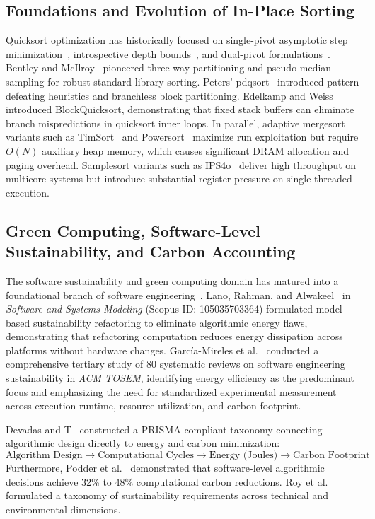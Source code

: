 \documentclass[journal]{IEEEtran}
\begin{document}
\subsection{Foundations and Evolution of In-Place Sorting}
Quicksort optimization has historically focused on single-pivot asymptotic step minimization~\cite{hoare1962quicksort,knuth1998art,sedgewick1977analysis}, introspective depth bounds~\cite{musser1997introspective}, and dual-pivot formulations~\cite{yaroslavskiy2009dual,wild2012average}. Bentley and McIlroy~\cite{bentley1993engineering} pioneered three-way partitioning and pseudo-median sampling for robust standard library sorting. Peters' pdqsort~\cite{peters2015pdqsort} introduced pattern-defeating heuristics and branchless block partitioning. Edelkamp and Weiss~\cite{edelkamp2019blockquicksort} introduced BlockQuicksort, demonstrating that fixed stack buffers can eliminate branch mispredictions in quicksort inner loops. In parallel, adaptive mergesort variants such as TimSort~\cite{peters2002timsort} and Powersort~\cite{munro2018powersort} maximize run exploitation but require $O(N)$ auxiliary heap memory, which causes significant DRAM allocation and paging overhead. Samplesort variants such as IPS4o~\cite{axtmann2017ips4o} deliver high throughput on multicore systems but introduce substantial register pressure on single-threaded execution.

\subsection{Green Computing, Software-Level Sustainability, and Carbon Accounting}
The software sustainability and green computing domain has matured into a foundational branch of software engineering~\cite{garciamireles2026sustainability,devadas2026carbon,roy2026taxonomy}. Lano, Rahman, and Alwakeel~\cite{lano2026model} in \textit{Software and Systems Modeling} (Scopus ID: 105035703364) formulated model-based sustainability refactoring to eliminate algorithmic energy flaws, demonstrating that refactoring computation reduces energy dissipation across platforms without hardware changes. García-Mireles et al.~\cite{garciamireles2026sustainability} conducted a comprehensive tertiary study of 80 systematic reviews on software engineering sustainability in \textit{ACM TOSEM}, identifying energy efficiency as the predominant focus and emphasizing the need for standardized experimental measurement across execution runtime, resource utilization, and carbon footprint.

Devadas and T~\cite{devadas2026carbon} constructed a PRISMA-compliant taxonomy connecting algorithmic design directly to energy and carbon minimization:
\begin{equation}
    \text{Algorithm Design} \longrightarrow \text{Computational Cycles} \longrightarrow \text{Energy (Joules)} \longrightarrow \text{Carbon Footprint}
\end{equation}
Furthermore, Podder et al.~\cite{podder2026green} demonstrated that software-level algorithmic decisions achieve 32\% to 48\% computational carbon reductions. Roy et al.~\cite{roy2026taxonomy} formulated a taxonomy of sustainability requirements across technical and environmental dimensions. 
\end{document}
